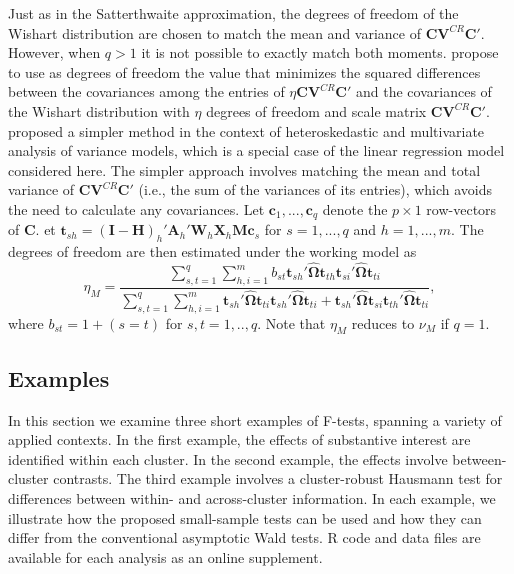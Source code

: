 \documentclass[12pt]{article}\usepackage[]{graphicx}\usepackage[]{color}
\newcommand{\bm}{\mathbf}
\newcommand{\bs}{\boldsymbol}
\begin{document}
Just as in the Satterthwaite approximation, the degrees of freedom of the Wishart distribution are chosen to match the mean and variance of $\bm{C}\bm{V}^{CR} \bm{C}'$. 
However, when $q > 1$ it is not possible to exactly match both moments. 
\cite{Pan2002small} propose to use as degrees of freedom the value that minimizes the squared differences between the covariances among the entries of $\eta \bm{C}\bm{V}^{CR}\bm{C}'$ and the covariances of the Wishart distribution with $\eta$ degrees of freedom and scale matrix $\bm{C}\bm{V}^{CR}\bm{C}'$. 
\citet{Zhang2012two-wayANOVA, Zhang2012MANOVA, Zhang2013tests} proposed a simpler method in the context of heteroskedastic and multivariate analysis of variance models, which is a special case of the linear regression model considered here. 
The simpler approach involves matching the mean and total variance of $\bm{C}\bm{V}^{CR}\bm{C}'$ (i.e., the sum of the variances of its entries), which avoids the need to calculate any covariances.
Let $\bm{c}_1,...,\bm{c}_q$ denote the $p \times 1$ row-vectors of $\bm{C}$.
et $\bm{t}_{sh} = \left(\bm{I} - \bm{H}\right)_h'\bm{A}_h'\bm{W}_h\bm{X}_h\bm{M}\bm{c}_s$ for $s = 1,...,q$ and $h = 1,...,m$. 
The degrees of freedom are then estimated under the working model as
\begin{equation}
\label{eq:eta_model}
\eta_M = \frac{\sum_{s,t=1}^q \sum_{h,i=1}^m b_{st} \bm{t}_{sh}'\hat{\bs\Omega}\bm{t}_{th} \bm{t}_{si}'\hat{\bs\Omega}\bm{t}_{ti}}{\sum_{s,t=1}^q \sum_{h,i=1}^m \bm{t}_{sh}'\hat{\bs\Omega}\bm{t}_{ti} \bm{t}_{sh}'\hat{\bs\Omega}\bm{t}_{ti} + \bm{t}_{sh}'\hat{\bs\Omega}\bm{t}_{si} \bm{t}_{th}'\hat{\bs\Omega}\bm{t}_{ti}},
\end{equation}
where $b_{st} = 1 + (s=t)$ for $s,t=1,..,q$.
Note that $\eta_M$ reduces to $\nu_M$ if $q = 1$.

\subsection{Examples}
\label{subsec:examples_F}

In this section we examine three short examples of F-tests, spanning a variety of applied contexts. In the first example, the effects of substantive interest are identified within each cluster. In the second example, the effects involve between-cluster contrasts. The third example involves a cluster-robust Hausmann test for differences between within- and across-cluster information. In each example, we illustrate how the proposed small-sample tests can be used and how they can differ from the conventional asymptotic Wald tests. R code and data files are available for each analysis as an online supplement.
\end{document}
